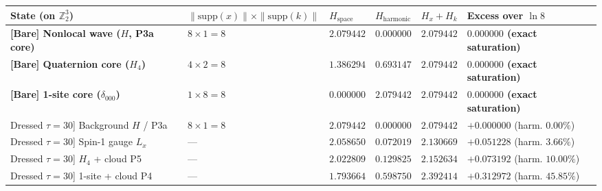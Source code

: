\documentclass[
  a4paper,
]{article}
\newcounter{none} %
\begin{document}
{\def\LTcaptype{none} %
\begin{longtable}[]{@{}
  >{\raggedright\arraybackslash}p{}
  >{\centering\arraybackslash}p{}
  >{\centering\arraybackslash}p{}
  >{\centering\arraybackslash}p{}
  >{\centering\arraybackslash}p{}
  >{\centering\arraybackslash}p{}@{}}
\toprule\noalign{}
\begin{minipage}[b]{\linewidth}\raggedright
State (on \(\mathbb{Z}_2^3\))
\end{minipage} & \begin{minipage}[b]{\linewidth}\centering
\(\|\mathrm{supp}(x)\| \times \|\mathrm{supp}(k)\|\)
\end{minipage} & \begin{minipage}[b]{\linewidth}\centering
\(H_{\mathrm{space}}\)
\end{minipage} & \begin{minipage}[b]{\linewidth}\centering
\(H_{\mathrm{harmonic}}\)
\end{minipage} & \begin{minipage}[b]{\linewidth}\centering
\(H_x + H_k\)
\end{minipage} & \begin{minipage}[b]{\linewidth}\centering
Excess over \(\ln 8\)
\end{minipage} \\
\midrule\noalign{}
\endhead
\bottomrule\noalign{}
\endlastfoot
\textbf{{[}Bare{]} Nonlocal wave (\(H\), P3a core)} &
\textbf{\(8 \times 1 = 8\)} & \(2.079442\) & \(0.000000\) &
\textbf{\(2.079442\)} & \textbf{\(0.000000\) (exact saturation)} \\
\textbf{{[}Bare{]} Quaternion core (\(H_4\))} &
\textbf{\(4 \times 2 = 8\)} & \(1.386294\) & \(0.693147\) &
\textbf{\(2.079442\)} & \textbf{\(0.000000\) (exact saturation)} \\
\textbf{{[}Bare{]} 1-site core (\(\delta_{000}\))} &
\textbf{\(1 \times 8 = 8\)} & \(0.000000\) & \(2.079442\) &
\textbf{\(2.079442\)} & \textbf{\(0.000000\) (exact saturation)} \\
{[}Dressed \(\tau=30\){]} Background \(H\) / P3a & \(8 \times 1 = 8\) &
\(2.079442\) & \(0.000000\) & \(2.079442\) & \(+0.000000\) (harm.
\(0.00\%\)) \\
{[}Dressed \(\tau=30\){]} Spin-1 gauge \(L_x\) & --- & \(2.058650\) &
\(0.072019\) & \(2.130669\) & \(+0.051228\) (harm. \(3.66\%\)) \\
{[}Dressed \(\tau=30\){]} \(H_4\) + cloud P5 & --- & \(2.022809\) &
\(0.129825\) & \(2.152634\) & \(+0.073192\) (harm. \(10.00\%\)) \\
{[}Dressed \(\tau=30\){]} 1-site + cloud P4 & --- & \(1.793664\) &
\(0.598750\) & \(2.392414\) & \(+0.312972\) (harm. \(45.85\%\)) \\
\end{longtable}
}
\end{document}
